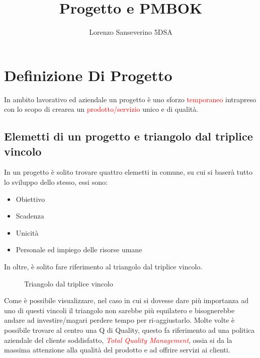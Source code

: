 \documentclass{article}
\title{Progetto e PMBOK}
\author{Lorenzo Sanseverino 5DSA}
\begin{document}
\tableofcontents
\maketitle


\section{Definizione Di Progetto}

In ambito lavorativo ed aziendale un progetto è uno sforzo \textcolor{red}{temporaneo} intrapreso con lo scopo di crearea un \textcolor{red}{prodotto/servizio} unico e di qualità. 

\subsection{Elemetti di un progetto e triangolo dal triplice vincolo}
In un progetto è solito trovare quattro elemetti in comune, su cui si baserà tutto lo sviluppo dello stesso, essi sono:

\begin{itemize}
\item Obiettivo
\item Scadenza
\item Unicità
\item Personale ed impiego delle risorse umane
\end{itemize}

In oltre, è solito fare riferimento al triangolo dal triplice vincolo.
\begin{figure}[h]
\caption{Triangolo dal triplice vincolo}
\label{t}
\end{figure}
Come è possibile visualizzare, nel caso in cui si dovesse dare più importanza ad uno di questi vincoli il triangolo non sarebbe più equilatero e bisognerebbe andare ad investire/magari perdere tempo per ri-aggiustarlo.
Molte volte è possibile trovare al centro una Q di Quality, questo fa riferimento ad una politica aziendale del cliente soddisfatto, \textit{\textcolor{red}{Total Quality Management}}, ossia si da la massima attenzione alla qualità del prodotto e ad offrire servizi ai clienti.
\end{document}
